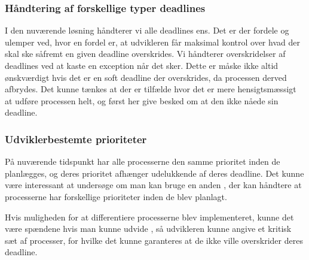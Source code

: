 \subsubsection{Håndtering af forskellige typer deadlines}
I den nuværende løsning håndterer vi alle deadlines ens. Det er der fordele og ulemper ved, hvor en fordel er, at udvikleren får maksimal kontrol over hvad der skal ske såfremt en given deadline overskrides. Vi håndterer overskridelser af deadlines ved at kaste en exception når det sker. Dette er måske ikke altid ønskværdigt hvis det er en soft deadline der overskrides, da processen derved afbrydes. Det kunne tænkes at der er tilfælde hvor det er mere hensigtsmæssigt at udføre processen helt, og først her give besked om at den ikke nåede sin deadline.

\subsubsection{Udviklerbestemte prioriteter}
På nuværende tidspunkt har alle processerne den samme prioritet inden de planlægges, og deres prioritet afhænger udelukkende af deres deadline. Det kunne være interessant at undersøge om man kan bruge en anden \sched, der kan håndtere at processerne har forskellige prioriteter inden de blev planlagt.

Hvis muligheden  for at differentiere processerne blev implementeret, kunne det være spændene hvis man kunne udvide \sched, så udvikleren kunne angive et kritisk sæt af processer, for hvilke det kunne garanteres at de ikke ville overskrider deres deadline. 






